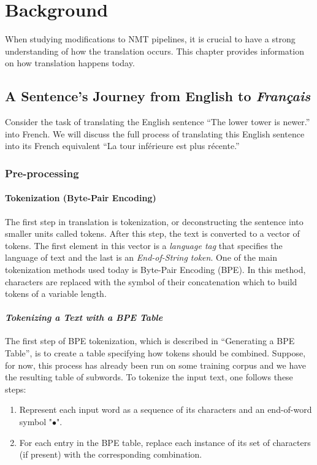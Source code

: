 \chapter{Background}
When studying modifications to NMT pipelines, it is crucial to have a strong understanding of how the translation occurs. This chapter provides information on how translation happens today.
\section{A Sentence's Journey from English to \textit{Français}}
Consider the task of translating the English sentence “The lower tower is newer.” into French. We will discuss the full process of translating this English sentence into its French equivalent “La tour inférieure est plus récente.”

\subsection{Pre-processing}
\subsubsection{Tokenization (Byte-Pair Encoding)}
The first step in translation is tokenization, or deconstructing the sentence into smaller units called tokens. After this step, the text is converted to a vector of tokens. The first element in this vector is a \textit{language tag} that specifies the language of text and the last is an \textit{End-of-String token}. One of the main tokenization methods used today is Byte-Pair Encoding (BPE). In this method, characters are replaced with the symbol of their concatenation which to build tokens of a variable length. 

\subsubsection*{\textit{\small{Tokenizing a Text with a BPE Table}}} 
The first step of BPE tokenization, which is described in “Generating a BPE Table”, is to create a table specifying how tokens should be combined. Suppose, for now, this process has already been run on some training corpus and we have the resulting table of subwords. To tokenize the input text, one follows these steps:

\begin{enumerate}
  \item Represent each input word as a sequence of its characters and an end-of-word symbol "$\bullet$". 
  \item For each entry in the BPE table, replace each instance of its set of characters (if present) with the corresponding combination.
\end{enumerate}

